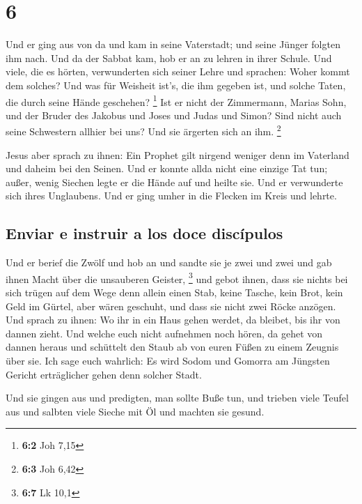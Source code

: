 \hypertarget{section-5}{%
\section{6}\label{section-5}}

 Und er ging aus von da und kam in seine Vaterstadt; und
seine Jünger folgten ihm nach.  Und da der Sabbat kam, hob
er an zu lehren in ihrer Schule. Und viele, die es hörten, verwunderten
sich seiner Lehre und sprachen: Woher kommt dem solches? Und was für
Weisheit ist's, die ihm gegeben ist, und solche Taten, die durch seine
Hände geschehen? \footnote{\textbf{6:2} Joh 7,15}  Ist er
nicht der Zimmermann, Marias Sohn, und der Bruder des Jakobus und Joses
und Judas und Simon? Sind nicht auch seine Schwestern allhier bei uns?
Und sie ärgerten sich an ihm. \footnote{\textbf{6:3} Joh 6,42}

 Jesus aber sprach zu ihnen: Ein Prophet gilt nirgend
weniger denn im Vaterland und daheim bei den Seinen.  Und
er konnte allda nicht eine einzige Tat tun; außer, wenig Siechen legte
er die Hände auf und heilte sie.  Und er verwunderte sich
ihres Unglaubens. Und er ging umher in die Flecken im Kreis und lehrte.

\hypertarget{enviar-e-instruir-a-los-doce-discuxedpulos}{%
\subsection{Enviar e instruir a los doce
discípulos}\label{enviar-e-instruir-a-los-doce-discuxedpulos}}

 Und er berief die Zwölf und hob an und sandte sie je zwei
und zwei und gab ihnen Macht über die unsauberen Geister, \footnote{\textbf{6:7}
  Lk 10,1}  und gebot ihnen, dass sie nichts bei sich
trügen auf dem Wege denn allein einen Stab, keine Tasche, kein Brot,
kein Geld im Gürtel,  aber wären geschuht, und dass sie
nicht zwei Röcke anzögen.  Und sprach zu ihnen: Wo ihr in
ein Haus gehen werdet, da bleibet, bis ihr von dannen zieht.
 Und welche euch nicht aufnehmen noch hören, da gehet von
dannen heraus und schüttelt den Staub ab von euren Füßen zu einem
Zeugnis über sie. Ich sage euch wahrlich: Es wird Sodom und Gomorra am
Jüngsten Gericht erträglicher gehen denn solcher Stadt.

 Und sie gingen aus und predigten, man sollte Buße tun,
 und trieben viele Teufel aus und salbten viele Sieche
mit Öl und machten sie gesund.


